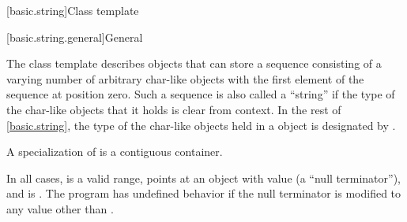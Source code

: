 [basic.string]{Class template }

[basic.string.general]{General}

\pnum
{}%
The
class template
describes objects that can store a sequence consisting of a varying number of
arbitrary char-like objects with the first element of the sequence at position zero.
Such a sequence is also called a ``string'' if the type of the
char-like objects that it holds
is clear from context.
In the rest of \ref{basic.string},
the type of the char-like objects held in a  object
is designated by .

\pnum
A specialization of  is a contiguous container.

\pnum
In all cases,
 is a valid range,
 points at an object with value 
(a ``null terminator''),
and  is .
The program has undefined behavior if
the null terminator is modified to any value other than .


